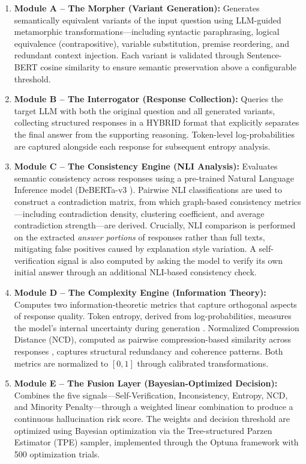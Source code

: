 \begin{enumerate}
    \item \textbf{Module A -- The Morpher (Variant Generation):} Generates semantically equivalent variants of the input question using LLM-guided metamorphic transformations---including syntactic paraphrasing, logical equivalence (contrapositive), variable substitution, premise reordering, and redundant context injection. Each variant is validated through Sentence-BERT \cite{reimers2019sentence} cosine similarity to ensure semantic preservation above a configurable threshold.

    \item \textbf{Module B -- The Interrogator (Response Collection):} Queries the target LLM with both the original question and all generated variants, collecting structured responses in a HYBRID format that explicitly separates the final answer from the supporting reasoning. Token-level log-probabilities are captured alongside each response for subsequent entropy analysis.

    \item \textbf{Module C -- The Consistency Engine (NLI Analysis):} Evaluates semantic consistency across responses using a pre-trained Natural Language Inference model (DeBERTa-v3 \cite{he2021deberta}). Pairwise NLI classifications are used to construct a contradiction matrix, from which graph-based consistency metrics---including contradiction density, clustering coefficient, and average contradiction strength---are derived. Crucially, NLI comparison is performed on the extracted \textit{answer portions} of responses rather than full texts, mitigating false positives caused by explanation style variation. A self-verification signal is also computed by asking the model to verify its own initial answer through an additional NLI-based consistency check.

    \item \textbf{Module D -- The Complexity Engine (Information Theory):} Computes two information-theoretic metrics that capture orthogonal aspects of response quality. Token entropy, derived from log-probabilities, measures the model's internal uncertainty during generation \cite{huang2023survey}. Normalized Compression Distance (NCD), computed as pairwise compression-based similarity across responses \cite{cilibrasi2005clustering}, captures structural redundancy and coherence patterns. Both metrics are normalized to $[0, 1]$ through calibrated transformations.

    \item \textbf{Module E -- The Fusion Layer (Bayesian-Optimized Decision):} Combines the five signals---Self-Verification, Inconsistency, Entropy, NCD, and Minority Penalty---through a weighted linear combination to produce a continuous hallucination risk score. The weights and decision threshold are optimized using Bayesian optimization via the Tree-structured Parzen Estimator (TPE) sampler, implemented through the Optuna framework with 500 optimization trials.


\end{enumerate}
